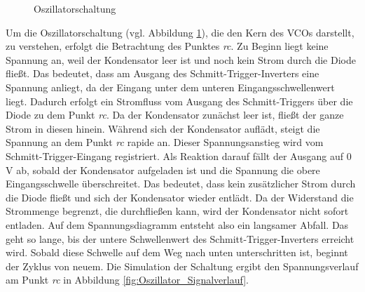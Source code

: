 \begin{figure}[h]
	\centering
	\setlength{\fboxsep}{1pt} %
	\setlength{\fboxrule}{1pt} %
	\caption{Oszillatorschaltung}
	\label{fig:Oszillatorschaltung}
\end{figure}

Um die Oszillatorschaltung (vgl. Abbildung \ref{fig:Oszillatorschaltung}), die den Kern des VCOs darstellt, zu verstehen, erfolgt die Betrachtung des Punktes \textit{rc}.
Zu Beginn liegt keine Spannung an, weil der Kondensator leer ist und noch kein Strom durch die Diode fließt. 
Das bedeutet, dass am Ausgang des Schmitt-Trigger-Inverters eine Spannung anliegt, da der Eingang unter dem unteren Eingangsschwellenwert liegt. 
Dadurch erfolgt ein Stromfluss vom Ausgang des Schmitt-Triggers über die Diode zu dem Punkt \textit{rc}. 
Da der Kondensator zunächst leer ist, fließt der ganze Strom in diesen hinein.
Während sich der Kondensator auflädt, steigt die Spannung an dem Punkt \textit{rc} rapide an.
Dieser Spannungsanstieg wird vom Schmitt-Trigger-Eingang registriert. 
Als Reaktion darauf fällt der Ausgang auf 0 V ab, sobald der Kondensator aufgeladen ist und die Spannung die obere Eingangsschwelle überschreitet.
Das bedeutet, dass kein zusätzlicher Strom durch die Diode fließt und sich der Kondensator wieder entlädt. 
Da der Widerstand die Strommenge begrenzt, die durchfließen kann, wird der Kondensator nicht sofort entladen. 
Auf dem Spannungsdiagramm entsteht also ein langsamer Abfall. 
Das geht so lange, bis der untere Schwellenwert des Schmitt-Trigger-Inverters erreicht wird. 
Sobald diese Schwelle auf dem Weg nach unten unterschritten ist, beginnt der Zyklus von neuem.
Die Simulation der Schaltung ergibt den Spannungsverlauf am Punkt \textit{rc} in Abbildung \ref{fig:Oszillator_Signalverlauf}.

